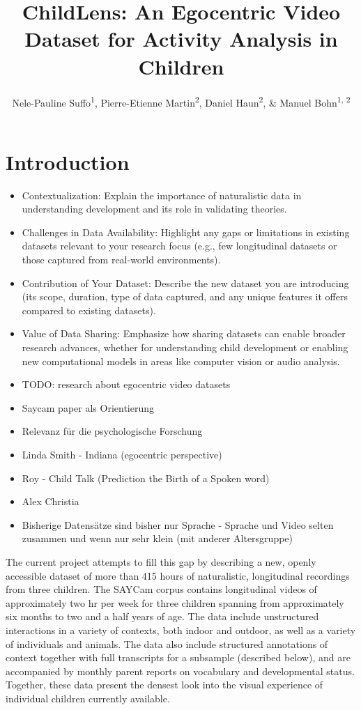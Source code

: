 \documentclass[
  man,floatsintext]{apa6}
\title{ChildLens: An Egocentric Video Dataset for Activity Analysis in Children}
\author{Nele-Pauline Suffo\textsuperscript{1}, Pierre-Etienne Martin\textsuperscript{2}, Daniel Haun\textsuperscript{2}, \& Manuel Bohn\textsuperscript{1, 2}}
\date{}
\affiliation{\vspace{0.5cm}\textsuperscript{1} Institute of Psychology in Education, Leuphana University Lüneburg\\\textsuperscript{2} Max Planck Institute for Evolutionary Anthropology}
\begin{document}
\maketitle

\section{Introduction}\label{introduction}

\begin{itemize}
\item
  Contextualization: Explain the importance of naturalistic data in understanding development and its role in validating theories.
\item
  Challenges in Data Availability: Highlight any gaps or limitations in existing datasets relevant to your research focus (e.g., few longitudinal datasets or those captured from real-world environments).
\item
  Contribution of Your Dataset: Describe the new dataset you are introducing (its scope, duration, type of data captured, and any unique features it offers compared to existing datasets).
\item
  Value of Data Sharing: Emphasize how sharing datasets can enable broader research advances, whether for understanding child development or enabling new computational models in areas like computer vision or audio analysis.
\item
  TODO: research about egocentric video datasets
\item
  Saycam paper als Orientierung
\item
  Relevanz für die psychologische Forschung
\item
  Linda Smith - Indiana (egocentric perspective)
\item
  Roy - Child Talk (Prediction the Birth of a Spoken word)
\item
  Alex Christia
\item
  Bisherige Datensätze sind bisher nur Sprache - Sprache und Video selten zusammen und wenn nur sehr klein (mit anderer Altersgruppe)
\end{itemize}

The current project attempts to fill this gap by describing a new, openly accessible dataset of more than 415 hours of naturalistic, longitudinal recordings from three children. The SAYCam corpus contains longitudinal videos of approximately two hr per week for three children spanning from approximately six months to two and a half years of age. The data include unstructured interactions in a variety of contexts, both indoor and outdoor, as well as a variety of individuals and animals. The data also include structured annotations of context together with full transcripts for a subsample (described below), and are accompanied by monthly parent reports on vocabulary and developmental status. Together, these data present the densest look into the visual experience of individual children currently available.
\end{document}
